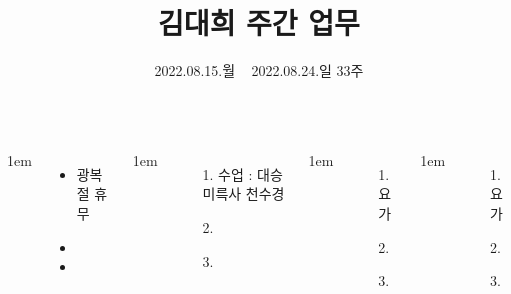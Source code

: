 \documentclass[17pt, a1paper ]{tikzposter} %
\title{ 김대희 주간 업무 }
\author{ 2022.08.15.월 ~ 2022.08.24.일 33주 }
\begin{document}
	\begin{columns}


			{
					\setlength{\leftmargini}{4em}
					\setlength{\labelsep} {1em}
					\begin{itemize}
					\item 광복절 휴무
					\item 
					\item 
					\end{itemize}
			}


			{
					\setlength{\leftmargini}{4em}
					\setlength{\labelsep} {1em}
					\begin{itemize}
					\item [1.] 수업 : 대승 미륵사 천수경
					\item [2.] 
					\item [3.] 
					\end{itemize}
			}



			{
					\setlength{\leftmargini}{4em}
					\setlength{\labelsep} {1em}
					\begin{itemize}
					\item [1.] 요가
					\item [2.] 
					\item [3.] 
					\end{itemize}
			}


			{
					\setlength{\leftmargini}{4em}
					\setlength{\labelsep} {1em}
					\begin{itemize}
					\item [1.] 요가
					\item [2.] 
					\item [3.] 
					\end{itemize}
			}


\end{columns}
\end{document}
